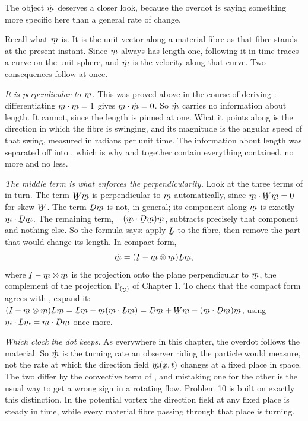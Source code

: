 \begin{remark}\label{rem:mdot}
The object $\dot\bm$ deserves a closer look, because the overdot is saying
something more specific here than a general rate of change.

Recall what $\bm$ is. It is the unit vector along a material fibre as that
fibre stands at the present instant. Since $\bm$ always has length one,
following it in time traces a curve on the unit sphere, and $\dot\bm$ is
the velocity along that curve. Two consequences follow at once.

\emph{It is perpendicular to $\bm$.} This was proved above in the course
of deriving : differentiating $\ip\bm\bm=1$ gives
$\ip\bm{\dot\bm}=0$. So $\dot\bm$ carries no information about length. It
cannot, since the length is pinned at one. What it points along is the
direction in which the fibre is swinging, and its magnitude is the angular
speed of that swing, measured in radians per unit time. The information
about length was separated off into , which is why 
and  together contain everything  contained, no more
and no less.

\emph{The middle term is what enforces the perpendicularity.} Look at the
three terms of  in turn. The term $\bW\bm$ is perpendicular to
$\bm$ automatically, since $\ip\bm{\bW\bm}=0$ for skew $\bW$. The term
$\bD\bm$ is not, in general; its component along $\bm$ is exactly
$\ip\bm{\bD\bm}$. The remaining term, $-(\ip\bm{\bD\bm})\bm$, subtracts
precisely that component and nothing else. So the formula says: apply
$\bL$ to the fibre, then remove the part that would change its length. In
compact form,
\[
   \dot\bm=(\I-\bm\otimes\bm)\bL\bm ,
\]
where $\I-\bm\otimes\bm$ is the projection onto the plane perpendicular to
$\bm$, the complement of the projection $\Proj\bn$ of Chapter 1. To check
that the compact form agrees with , expand it:
$(\I-\bm\otimes\bm)\bL\bm=\bL\bm-\bm(\ip\bm{\bL\bm})
=\bD\bm+\bW\bm-(\ip\bm{\bD\bm})\bm$, using $\ip\bm{\bL\bm}=\ip\bm{\bD\bm}$
once more.

\emph{Which clock the dot keeps.} As everywhere in this chapter, the
overdot follows the material. So $\dot\bm$ is the turning rate an observer
riding the particle would measure, not the rate at which the direction
field $\bm(\bx,t)$ changes at a fixed place in space. The two differ by
the convective term of , and mistaking one for the other is the
usual way to get a wrong sign in a rotating flow. Problem 10 is built on
exactly this distinction. In the potential vortex the direction field at
any fixed place is steady in time, while every material fibre passing
through that place is turning.
\end{remark}

